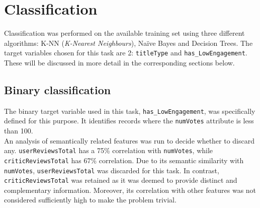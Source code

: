 
\chapter{Classification}
\label{ch:capitolo3}
Classification was performed on the available training set using three different algorithms: K-NN (\textit{K-Nearest Neighbours}), Naïve Bayes and Decision Trees.
The target variables chosen for this task are 2: \texttt{titleType} and \texttt{has\_LowEngagement}.
These will be discussed in more detail in the corresponding sections below.


\section{Binary classification}\label{sec:binary_classification}
The binary target variable used in this task, \texttt{has\_LowEngagement}, was specifically defined for this purpose. 
It identifies records where the \texttt{numVotes} attribute is less than 100.\\

An analysis of semantically related features was run to decide whether to discard any.
\texttt{userReviewsTotal} has a 75\% correlation with
\texttt{numVotes}, while \texttt{criticReviewsTotal} has 67\% correlation.
Due to its semantic similarity with \texttt{numVotes}, \texttt{userReviewsTotal} was discarded for this task.
In contrast, \texttt{criticReviewsTotal} was retained as it was deemed to provide distinct and complementary information. 
Moreover, its correlation with other features was not considered sufficiently high to make the problem trivial.\\

